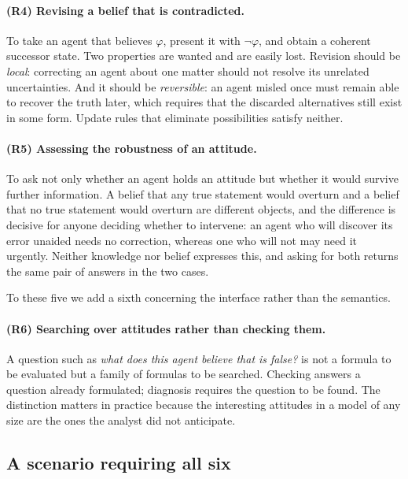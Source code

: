 \documentclass[11pt,a4paper]{article}
\begin{document}
\paragraph{(R4) Revising a belief that is contradicted.}
To take an agent that believes $\varphi$, present it with $\neg\varphi$, and obtain a coherent
successor state. Two properties are wanted and are easily lost. Revision should be
\emph{local}: correcting an agent about one matter should not resolve its unrelated
uncertainties. And it should be \emph{reversible}: an agent misled once must remain able to
recover the truth later, which requires that the discarded alternatives still exist in some
form. Update rules that eliminate possibilities satisfy neither.

\paragraph{(R5) Assessing the robustness of an attitude.}
To ask not only whether an agent holds an attitude but whether it would survive further
information. A belief that any true statement would overturn and a belief that no true
statement would overturn are different objects, and the difference is decisive for anyone
deciding whether to intervene: an agent who will discover its error unaided needs no
correction, whereas one who will not may need it urgently. Neither knowledge nor belief
expresses this, and asking for both returns the same pair of answers in the two cases.

\medskip

To these five we add a sixth concerning the interface rather than the semantics.

\paragraph{(R6) Searching over attitudes rather than checking them.}
A question such as \emph{what does this agent believe that is false?} is not a formula to be
evaluated but a family of formulas to be searched. Checking answers a question already
formulated; diagnosis requires the question to be found. The distinction matters in practice
because the interesting attitudes in a model of any size are the ones the analyst did not
anticipate.

\subsection{A scenario requiring all six}
\label{sec:running}
\end{document}
